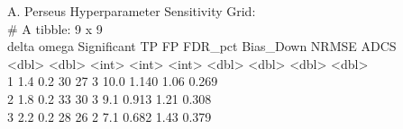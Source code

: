 \documentclass[11pt,oneside]{book}
\begin{document}
\begin{routput}
A. Perseus Hyperparameter Sensitivity Grid:\\
\# A tibble: 9 x 9\\
\hspace*{1em}delta omega Significant \hspace*{0.5em}TP \hspace*{0.5em}FP FDR\_pct Bias\_Down NRMSE \hspace*{0.5em}ADCS\\
\hspace*{1em}\textless{}dbl\textgreater{} \textless{}dbl\textgreater{} \hspace*{2.5em}\textless{}int\textgreater{} \textless{}int\textgreater{} \textless{}int\textgreater{} \hspace*{1.2em}\textless{}dbl\textgreater{} \hspace*{1.8em}\textless{}dbl\textgreater{} \textless{}dbl\textgreater{} \textless{}dbl\textgreater{}\\
1 \hspace*{0.5em}1.4 \hspace*{0.8em}0.2 \hspace*{4em}30 \hspace*{1.5em}27 \hspace*{1em}3 \hspace*{1.8em}10.0 \hspace*{2em}1.140 \hspace*{1em}1.06 \hspace*{0.8em}0.269\\
2 \hspace*{0.5em}1.8 \hspace*{0.8em}0.2 \hspace*{4em}33 \hspace*{1.5em}30 \hspace*{1em}3 \hspace*{2.2em}9.1 \hspace*{2em}0.913 \hspace*{1em}1.21 \hspace*{0.8em}0.308\\
3 \hspace*{0.5em}2.2 \hspace*{0.8em}0.2 \hspace*{4em}28 \hspace*{1.5em}26 \hspace*{1em}2 \hspace*{2.2em}7.1 \hspace*{2em}0.682 \hspace*{1em}1.43 \hspace*{0.8em}0.379\\

\end{routput}
\end{document}
